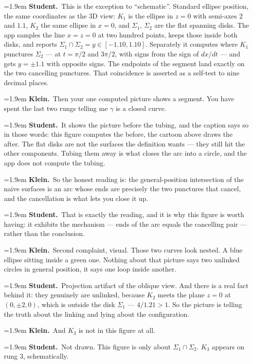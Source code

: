 \documentclass[11pt]{article}
\newcommand{\Stu}[1]{\par\smallskip\noindent\hangindent=1.9em\hangafter=1%
  \textcolor{stucol}{\textbf{Student.}}~#1\par}
\newcommand{\Kle}[1]{\par\smallskip\noindent\hangindent=1.9em\hangafter=1%
  \textcolor{klecol}{\textbf{Klein.}}~#1\par}
\begin{document}
\Stu{This is the exception to ``schematic''. Standard ellipse position, the same coordinates as the 3D view: $K_1$ is the ellipse in $z = 0$ with semi-axes $2$ and $1.1$, $K_2$ the same ellipse in $x = 0$, and $\Sigma_1$, $\Sigma_2$ are the flat spanning disks. The app samples the line $x = z = 0$ at two hundred points, keeps those inside both disks, and reports $\Sigma_1 \cap \Sigma_2 = y \in [-1.10, 1.10]$. Separately it computes where $K_1$ punctures $\Sigma_2$ --- at $t = \pi/2$ and $3\pi/2$, with signs from the sign of $dx/dt$ --- and gets $y = \pm 1.1$ with opposite signs. The endpoints of the segment land exactly on the two cancelling punctures. That coincidence is asserted as a self-test to nine decimal places.}

\Kle{Then your one computed picture shows a segment. You have spent the last two rungs telling me $\gamma$ is a closed curve.}

\Stu{It shows the picture before the tubing, and the caption says so in those words: this figure computes the before, the cartoon above draws the after. The flat disks are not the surfaces the definition wants --- they still hit the other components. Tubing them away is what closes the arc into a circle, and the app does not compute the tubing.}

\Kle{So the honest reading is: the general-position intersection of the naive surfaces is an arc whose ends are precisely the two punctures that cancel, and the cancellation is what lets you close it up.}

\Stu{That is exactly the reading, and it is why this figure is worth having: it exhibits the mechanism --- ends of the arc equals the cancelling pair --- rather than the conclusion.}

\Kle{Second complaint, visual. Those two curves look nested. A blue ellipse sitting inside a green one. Nothing about that picture says two unlinked circles in general position, it says one loop inside another.}

\Stu{Projection artifact of the oblique view. And there is a real fact behind it: they genuinely are unlinked, because $K_2$ meets the plane $z = 0$ at $(0, \pm 2, 0)$, which is outside the disk $\Sigma_1$ --- $4/1.21 > 1$. So the picture is telling the truth about the linking and lying about the configuration.}

\Kle{And $K_3$ is not in this figure at all.}

\Stu{Not drawn. This figure is only about $\Sigma_1 \cap \Sigma_2$. $K_3$ appears on rung $3$, schematically.}
\end{document}
